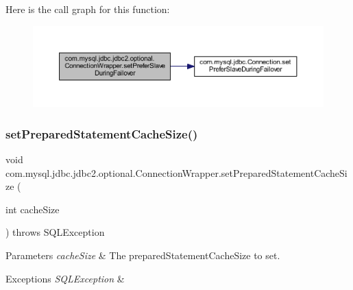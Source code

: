Here is the call graph for this function\+:
\nopagebreak
\begin{figure}[H]
\begin{center}
\leavevmode
\includegraphics[width=350pt]{classcom_1_1mysql_1_1jdbc_1_1jdbc2_1_1optional_1_1_connection_wrapper_a41e30138708f151589417be4f59e8c59_cgraph}
\end{center}
\end{figure}
\mbox{\label{classcom_1_1mysql_1_1jdbc_1_1jdbc2_1_1optional_1_1_connection_wrapper_a5f678b0f5276621832a23fc1c9a31786}} 
\subsubsection{\texorpdfstring{set\+Prepared\+Statement\+Cache\+Size()}{setPreparedStatementCacheSize()}}
{\footnotesize\ttfamily void com.\+mysql.\+jdbc.\+jdbc2.\+optional.\+Connection\+Wrapper.\+set\+Prepared\+Statement\+Cache\+Size (\begin{DoxyParamCaption}\item[{int}]{cache\+Size }\end{DoxyParamCaption}) throws S\+Q\+L\+Exception}


\begin{DoxyParams}{Parameters}
{\em cache\+Size} & The prepared\+Statement\+Cache\+Size to set. \\
\hline
\end{DoxyParams}

\begin{DoxyExceptions}{Exceptions}
{\em S\+Q\+L\+Exception} & \\
\hline
\end{DoxyExceptions}


